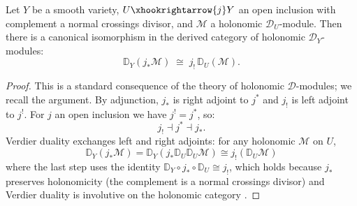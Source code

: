 \begin{lemma}%
\label{lem:verdier-extension-exchange}
Let $Y$ be a smooth variety, $U \xhookrightarrow{j} Y$ an open inclusion
with complement a normal crossings divisor, and $\mathcal{M}$ a holonomic
$\mathcal{D}_U$-module. Then there is a canonical isomorphism in the
derived category of holonomic $\mathcal{D}_Y$-modules:
\[
\mathbb{D}_Y(j_*\mathcal{M}) \;\cong\; j_!\,\mathbb{D}_U(\mathcal{M}).
\]
\end{lemma}

\begin{proof}
This is a standard consequence of the theory of holonomic
$\mathcal{D}$-modules; we recall the argument. By
adjunction, $j_*$ is right adjoint to $j^*$ and $j_!$ is left adjoint to
$j^!$. For $j$ an open inclusion we have $j^! = j^*$, so:
\[
j_! \dashv j^* \dashv j_*.
\]
Verdier duality exchanges left and right adjoints: for any holonomic
$\mathcal{M}$ on $U$,
\[
\mathbb{D}_Y(j_*\mathcal{M})
= \mathbb{D}_Y(j_* \mathbb{D}_U \mathbb{D}_U \mathcal{M})
\cong j_!(\mathbb{D}_U \mathcal{M})
\]
where the last step uses the identity
$\mathbb{D}_Y \circ j_* \circ \mathbb{D}_U \cong j_!$, which holds because
$j_*$ preserves holonomicity (the complement is a normal crossings divisor)
and Verdier duality is involutive on the holonomic category
\cite[Theorem~2.6.1]{HTT08}.
\end{proof}

